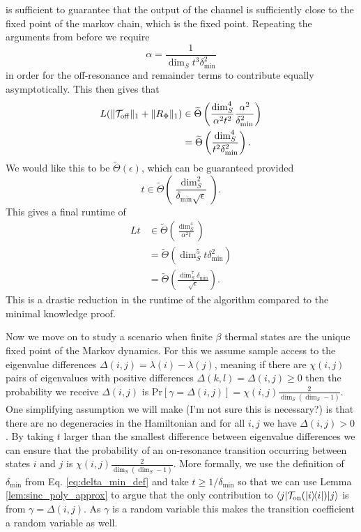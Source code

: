 \documentclass{article}
\newcommand{\on}{\rm on}
\newcommand{\off}{\rm off}
\newcommand{\ket}[1]{|#1\rangle}
\newcommand{\bra}[1]{\langle #1|}
\newcommand{\ketbra}[2]{| #1\rangle\! \langle #2|}
\newcommand{\parens}[1]{\left( #1 \right)}
\newcommand{\norm}[1]{\| #1 \|}
\newcommand{\TT}{\mathcal{T}}
\newcommand{\prob}[1]{\text{Pr}\left[ #1 \right]}
\begin{document}
is sufficient to guarantee that the output of the channel is sufficiently close to the fixed point of the markov chain, which is the fixed point. Repeating the arguments from before we require 
\begin{equation}
    \alpha = \frac{1}{\dim_S t^3 \delta_{\min}^2}
\end{equation}
in order for the off-resonance and remainder terms to contribute equally asymptotically. This then gives that 
\begin{align}
    L(\norm{\TT_{\off}}_1 + \norm{R_{\Phi}}_1) &\in \widetilde{\Theta} \parens{\frac{\dim_S^4}{\alpha^2 t^2} \frac{\alpha^2}{\delta_{\min}^2}} \\
    &= \widetilde{\Theta} \parens{\frac{\dim_S^4}{t^2 \delta_{\min}^2}}.
\end{align}
We would like this to be $\widetilde{\Theta}(\epsilon)$, which can be guaranteed provided
\begin{equation}
    t \in \widetilde{\Theta} \parens{\frac{\dim_S^2}{\delta_{\min} \sqrt{\epsilon}}}.
\end{equation}
This gives a final runtime of 
\begin{align}
    L t &\in \widetilde{\Theta} \parens{\frac{\dim_S^4}{\alpha^2 t}} \\
    &= \widetilde{\Theta} \parens{\dim_S^5 t \delta_{\min}^2} \\
    &= \widetilde{\Theta} \parens{\frac{\dim_S^7 \delta_{\min}}{\sqrt{\epsilon}}}.
\end{align}
This is a drastic reduction in the runtime of the algorithm compared to the minimal knowledge proof.

Now we move on to study a scenario when finite $\beta$ thermal states are the unique fixed point of the Markov dynamics. For this we assume sample access to the eigenvalue differences $\Delta(i,j) = \lambda(i) - \lambda(j)$, meaning if there are $\chi(i,j)$ pairs of eigenvalues with positive differences $\Delta(k,l) = \Delta(i,j) \ge 0$ then the probability we receive $\Delta(i,j)$ is $\prob{\gamma = \Delta(i,j)} = \chi(i,j) \frac{2}{\dim_S(\dim_S - 1)}$. One simplifying assumption we will make (I'm not sure this is necessary?) is that there are no degeneracies in the Hamiltonian and for all $i,j$ we have $\Delta(i,j) > 0$. By taking $t$ larger than the smallest difference between eigenvalue differences we can ensure that the probability of an on-resonance transition occurring between states $i$ and $j$ is $\chi(i,j) \frac{2}{\dim_S(\dim_S - 1)}$. More formally, we use the definition of $\delta_{\min}$ from Eq. \eqref{eq:delta_min_def} and take $t \ge 1/ \delta_{\min}$ so that we can use Lemma \ref{lem:sinc_poly_approx} to argue that the only contribution to $\bra{j} \mathcal{T}_{\on}(\ketbra{i}{i}) \ket{j}$ is from $\gamma = \Delta(i,j)$. As $\gamma$ is a random variable this makes the transition coefficient a random variable as well. 
\end{document}
